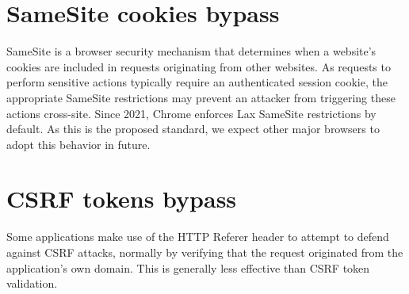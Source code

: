 \documentclass{article}
\begin{document}
\section*{SameSite cookies bypass}
SameSite is a browser security mechanism that determines when a website's cookies are included in requests originating from other websites. As requests to perform sensitive actions typically require an authenticated session cookie, the appropriate SameSite restrictions may prevent an attacker from triggering these actions cross-site. Since 2021, Chrome enforces Lax SameSite restrictions by default. As this is the proposed standard, we expect other major browsers to adopt this behavior in future. 

\section*{CSRF tokens bypass}
Some applications make use of the HTTP Referer header to attempt to defend against CSRF attacks, normally by verifying that the request originated from the application's own domain. This is generally less effective than CSRF token validation. 
\end{document}
